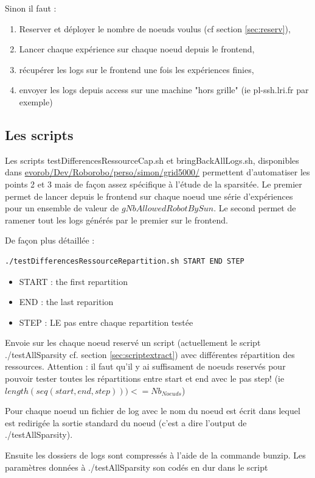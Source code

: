 \documentclass[a4paper,10pt]{report}
\begin{document}
Sinon il faut :
\begin{enumerate}
 \item Reserver et déployer le nombre de noeuds voulus (cf section \ref{sec:reserv}),
 \item Lancer chaque expérience sur chaque noeud depuis le frontend,
 \item récupérer les logs sur le frontend une fois les expériences finies,
 \item envoyer les logs depuis access sur une machine "hors grille" (ie pl-ssh.lri.fr par exemple)
\end{enumerate}

\subsection{Les scripts}
Les scripts testDifferencesRessourceCap.sh et bringBackAllLogs.sh, disponibles dans \url{evorob/Dev/Roborobo/perso/simon/grid5000/} permettent d'automatiser les points 2 et 3 mais de fa\c con assez spécifique à l'étude de la sparsitée. Le premier permet de lancer depuis le frontend sur chaque noeud une série d'expériences pour un ensemble de valeur de $gNbAllowedRobotBySun$. Le second permet de ramener tout les logs générés par le premier sur le frontend. 

De fa\c con plus détaillée :
\begin{lstlisting}[language=bash]
 ./testDifferencesRessourceRepartition.sh START END STEP
\end{lstlisting}
\begin{itemize}
 \item START : the first repartition
 \item END : the last reparition 
 \item STEP : LE pas entre chaque repartition testée
\end{itemize}
Envoie sur les chaque noeud reservé un script (actuellement le script ./testAllSparsity cf. section \ref{sec:scriptextract}) avec différentes répartition des ressources.
Attention : il faut qu'il y ai suffisament de noeuds reservés pour pouvoir tester toutes les répartitions entre start et end avec le pas step! (ie $length(seq(start,end,step)))<=Nb_{Noeuds}$)

Pour chaque noeud un fichier de log avec le nom du noeud est écrit dans lequel est redirigée la sortie standard du noeud (c'est a dire l'output de ./testAllSparsity). 

Ensuite les dossiers de logs sont compressés à l'aide de la commande bunzip.
Les paramètres données à ./testAllSparsity son codés en dur dans le script
\end{document}

